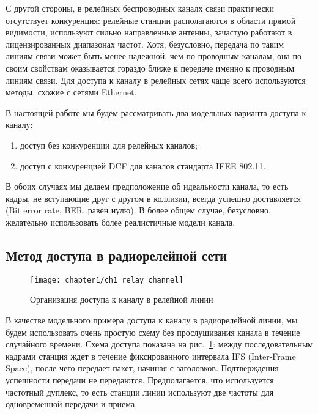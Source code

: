 С другой стороны, в релейных беспроводных каналх связи практически отсутствует конкуренция: релейные станции располагаются в области прямой видимости, используют сильно направленные антенны, зачастую работают в лицензированных диапазонах частот. Хотя, безусловно, передача по таким линиям связи может быть менее надежной, чем по проводным каналам, она по своим свойствам оказывается гораздо ближе к передаче именно к проводным линиям связи. Для доступа к каналу в релейных сетях чаще всего используются методы, схожие с сетями Ethernet.

В настоящей работе мы будем рассматривать два модельных варианта доступа к каналу:

\begin{enumerate}
\item доступ без конкуренции для релейных каналов;
\item доступ с конкуренцией DCF для каналов стандарта IEEE 802.11.
\end{enumerate}

В обоих случаях мы делаем предположение об идеальности канала, то есть кадры, не вступающие друг с другом в коллизии, всегда успешно доставляется (Bit error rate, BER, равен нулю). В более общем случае, безусловно, желательно использовать более реалистичные модели канала.

\subsection{Метод доступа в радиорелейной сети}

\begin{figure}[h!]
   \centering
    \texttt{[image: chapter1/ch1\_relay\_channel]}
	\caption{Организация доступа к каналу в релейной линии}
	\label{fig:relay}
\end{figure}

В качестве модельного примера доступа к каналу в радиорелейной линии, мы будем использовать очень простую схему без прослушивания канала в течение случайного времени. Схема доступа показана на рис.~\ref{fig:relay}: между последовательным кадрами станция ждет в течение фиксированного интервала IFS (Inter-Frame Space), после чего передает пакет, начиная с заголовков. Подтверждения успешности передачи не передаются. Предполагается, что используется частотный дуплекс, то есть станции линии используют две частоты для одновременной передачи и приема.

